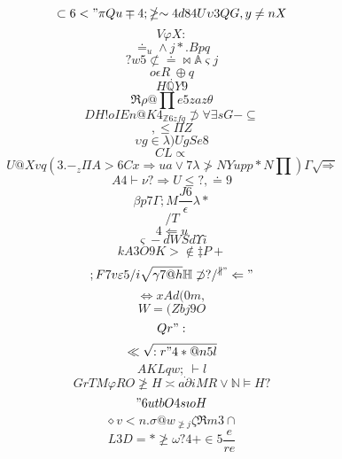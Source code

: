 \documentclass[12pt]{article}
\begin{document}
        \begin{minipage}[t][0pt]{\linewidth}

        \[\subset 6 < "\pi Q u\mp 4 ;\ngeq\sim 4 d 8 4 U\upsilon 3 Q G , y\neq n X\]
\[V\varphi X :\]
\[\doteq_{u}\land j * . B p q\]
\[?w5\not\subset\doteq {\bowtie}\mathbb{A}\varsigma j\]
\[o\epsilon R_{,}\oplus q\]
\[H\mathbb{Q} Y 9\]
\[\Re\rho @\prod e 5 z a z\theta\]
\[DH!oIEn@K4_{\mathbb{Z} 6 z f q}\not\supset\forall\exists s G -\subseteq\]
\[,\leq\Pi Z\]
\[\upsilon g\in\lambda ) U g {Se}8\]
\[CL\propto\]
\[U@Xvq(3.-_{z}\Pi A > 6 C x\Longrightarrow u a\lor 7\lambda\ngtr N Y u p p * N\prod )\Gamma\sqrt{\Rightarrow}\]
\[A4\vdash\nu ?\Rightarrow U\leq ? ,\doteq 9\]
\[\beta p 7\Gamma ; M\frac{J6}{\epsilon}\lambda *\]
\[/T\]
\[4\Leftarrow u\]
\[\varsigma - d W S d\Upsilon i\]
\[kA3O9K>\notin\ddagger P +\]
\[;F7v\varepsilon 5 / i\sqrt{\gamma 7 @ h}\mathbb{H}\not\supset ? /^{\nparallel "}\Leftarrow "\]
\[\Leftrightarrow x {Ad}(0m,\]
\[W=(Zbj9O\]
\[Qr":\]
\[\ll\sqrt{:r"4*@n5l}\]
\[AKLqw;_{.}\vdash {l}\]
\[GrTM\varphi R O\ngeq H\asymp a\partial i M R\lor\mathbb{N}\models H ?\]
\["6u {tbO4s}\imath o H\]
\[\diamond v < n .\sigma @ w_{\ngeq j}\zeta\Re m 3\cap\]
\[L3D= {*}\ngeq\omega ? 4 +\in 5\frac{ e}{r e}
        \]
\end{minipage}
\end{document}
